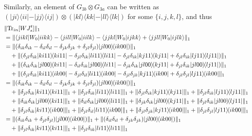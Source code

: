 \documentclass[a4paper,twocolumn,accepted=2022-10-23]{quantumarticle}
\newcommand{\bra}[1]{\langle {#1} \vert}
\newcommand{\ket}[1]{\vert {#1} \rangle}
\newcommand{\ketbra}[2]{\vert {#1} \rangle\!\langle {#2} \vert}
\newcommand{\Tr}[0]{{\mathrm{Tr}}}
\theoremstyle{definition}
\begin{document}
Similarly, an element of $G_{3b} \otimes G_{3a}$ can be written as
$(\ketbra{ji}{ii} - \ketbra{jj}{ij}) \otimes (\ketbra{kl}{kk} - \ketbra{ll}{lk})$ for some $\{i,j,k,l\}$, and thus
\begin{align}
& \| \Tr_{in} [W J_s^t] \|_1 \notag \\
&= \| \bra{jikl} {W_0} \ket{iikk} - \bra{jill} {W_0} \ket{iilk} - \bra{jjkl} {W_0} \ket{ijkk} + \bra{jjll} {W_0} \ket{ijlk} \|_1 \\
&= \| (\delta_{ik}\delta_{ik} - \delta_{il}\delta_{il} -\delta_{jk}\delta_{jk}  + \delta_{jl}\delta_{jl}) \ketbra{jl00}{ik00}) \|_1 \notag\\
&\quad + \| (\delta_{jl}\delta_{ik} \ketbra{ki11}{ki11} - \delta_{jl}\delta_{ik} \ketbra{li11}{li11}
-\delta_{jl}\delta_{ik} \ketbra{kj11}{kj11} + \delta_{jl}\delta_{ik} \ketbra{lj11}{lj11}) \|_1 \notag\\
&\quad + \| (\delta_{ik}\delta_{ik} \ketbra{jl00}{ki11} - \delta_{il}\delta_{ik} \ketbra{jl00}{li11}
-\delta_{jk}\delta_{ik} \ketbra{jl00}{kj11} + \delta_{jl}\delta_{ik} \ketbra{jl00}{lj11} ) \|_1 \notag\\
&\quad + \| (\delta_{jl}\delta_{ik} \ketbra{ki11}{ik00} - \delta_{jl}\delta_{il} \ketbra{li11}{ik00}
-\delta_{jl}\delta_{jk} \ketbra{kj11}{ik00} + \delta_{jl}\delta_{jl} \ketbra{lj11}{ik00} \|_1 \\
%
&= \| (\delta_{ik}\delta_{ik} - \delta_{il}\delta_{il} -\delta_{jk}\delta_{jk}  + \delta_{jl}\delta_{jl}) \ketbra{jl00}{ik00}) \|_1 \notag\\
&\quad + \| \delta_{jl}\delta_{ik} \ketbra{ki11}{ki11} \|_1 + \| \delta_{jl}\delta_{ik} \ketbra{li11}{li11} \|_1
+ \| \delta_{jl}\delta_{ik} \ketbra{kj11}{kj11} \|_1 + \| \delta_{jl}\delta_{ik} \ketbra{lj11}{lj11} \|_1 \notag\\
&\quad + \| \delta_{ik}\delta_{ik} \ketbra{jl00}{ki11} \|_1 + \| \delta_{il}\delta_{ik} \ketbra{jl00}{li11} \|_1
+ \| \delta_{jk}\delta_{ik} \ketbra{jl00}{kj11} \|_1 + \| \delta_{jl}\delta_{ik} \ketbra{jl00}{lj11} \|_1 \notag\\
&\quad + \| \delta_{jl}\delta_{ik} \ketbra{ki11}{ik00} \|_1 + \| \delta_{jl}\delta_{il} \ketbra{li11}{ik00} \|_1
+ \| \delta_{jl}\delta_{jk} \ketbra{kj11}{ik00} \|_1 + \| \delta_{jl}\delta_{jl} \ketbra{lj11}{ik00} \|_1 \\
%
&= \| (\delta_{ik}\delta_{ik} + \delta_{jl}\delta_{jl}) \ketbra{jl00}{ik00}) \|_1 + \| ( \delta_{il}\delta_{il} +\delta_{jk}\delta_{jk} ) \ketbra{jl00}{ik00}) \|_1   \notag\\
&\quad + \| \delta_{jl}\delta_{ik} \ketbra{ki11}{ki11} \|_1 + \| \delta_{jl}\delta_{ik} \ketbra{li11}{li11} \|_1

\end{align}
\end{document}
